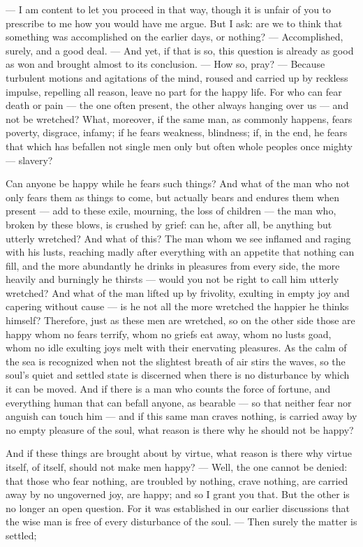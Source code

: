  — I am content to let you proceed in that way, though it is unfair of you to prescribe to me how you would have me argue. But I ask: are we to think that something was accomplished on the earlier days, or nothing? — Accomplished, surely, and a good deal. — And yet, if that is so, this question is already as good as won and brought almost to its conclusion. — How so, pray? — Because turbulent motions and agitations of the mind, roused and carried up by reckless impulse, repelling all reason, leave no part for the happy life. For who can fear death or pain — the one often present, the other always hanging over us — and not be wretched? What, moreover, if the same man, as commonly happens, fears poverty, disgrace, infamy; if he fears weakness, blindness; if, in the end, he fears that which has befallen not single men only but often whole peoples once mighty — slavery?

 Can anyone be happy while he fears such things? And what of the man who not only fears them as things to come, but actually bears and endures them when present — add to these exile, mourning, the loss of children — the man who, broken by these blows, is crushed by grief: can he, after all, be anything but utterly wretched? And what of this? The man whom we see inflamed and raging with his lusts, reaching madly after everything with an appetite that nothing can fill, and the more abundantly he drinks in pleasures from every side, the more heavily and burningly he thirsts — would you not be right to call him utterly wretched? And what of the man lifted up by frivolity, exulting in empty joy and capering without cause — is he not all the more wretched the happier he thinks himself? Therefore, just as these men are wretched, so on the other side those are happy whom no fears terrify, whom no griefs eat away, whom no lusts goad, whom no idle exulting joys melt with their enervating pleasures. As the calm of the sea is recognized when not the slightest breath of air stirs the waves, so the soul's quiet and settled state is discerned when there is no disturbance by which it can be moved. And if there is a man who counts the force of fortune, and everything human that can befall anyone, as bearable — so that neither fear nor anguish can touch him — and if this same man craves nothing, is carried away by no empty pleasure of the soul, what reason is there why he should not be happy?

 And if these things are brought about by virtue, what reason is there why virtue itself, of itself, should not make men happy? — Well, the one cannot be denied: that those who fear nothing, are troubled by nothing, crave nothing, are carried away by no ungoverned joy, are happy; and so I grant you that. But the other is no longer an open question. For it was established in our earlier discussions that the wise man is free of every disturbance of the soul. — Then surely the matter is settled;

